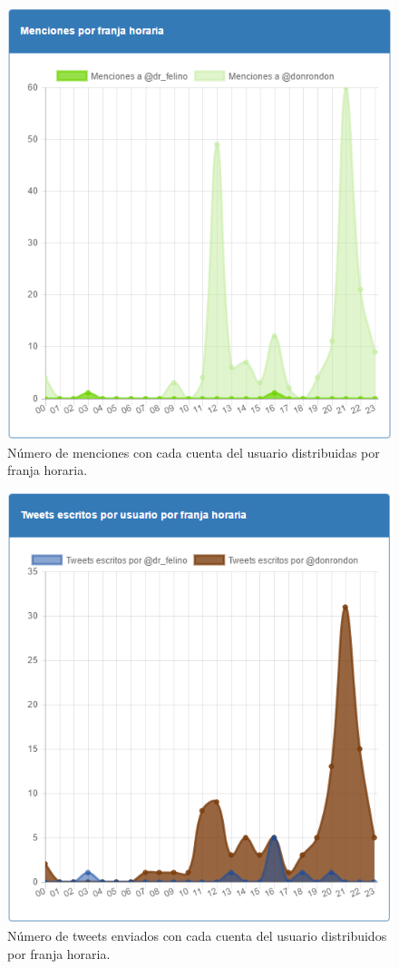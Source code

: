\documentclass[a4paper]{article}
\begin{document}
			\begin{figure}[H]
				\centering
				\includegraphics[width=0.6\linewidth]{img/mencionesHoras}
				\caption{Número de menciones con cada cuenta del usuario distribuidas por franja horaria.}
				\label{fig:mencionesHoras}
			\end{figure}
			
			\begin{figure}[H]
				\centering
				\includegraphics[width=0.6\linewidth]{img/tweetsHoras}
				\caption{Número de tweets enviados con cada cuenta del usuario distribuidos por franja horaria.}
				\label{fig:tweetsHoras}
			\end{figure}
			
\end{document}
